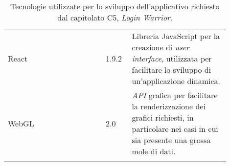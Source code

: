 {\begin{longtable}{>{\raggedright\arraybackslash}m{0.40\linewidth}m{0.10\linewidth}m{0.40\linewidth}}
    \rowcolor[RGB]{233, 245, 206}
    React & 1.9.2 & Libreria JavaScript per la creazione di \textit{user interface}, utilizzata per facilitare lo sviluppo di un'applicazione dinamica.\\

    \rowcolor[RGB]{216, 235, 171}
    WebGL & 2.0 & \textit{API} grafica per facilitare la renderizzazione dei grafici richiesti, in particolare nei casi in cui sia presente una grossa mole di dati.\\

    \caption{Tecnologie utilizzate per lo sviluppo dell'applicativo richiesto dal capitolato C5, \textit{Login Warrior}.}
\end{longtable}
}



